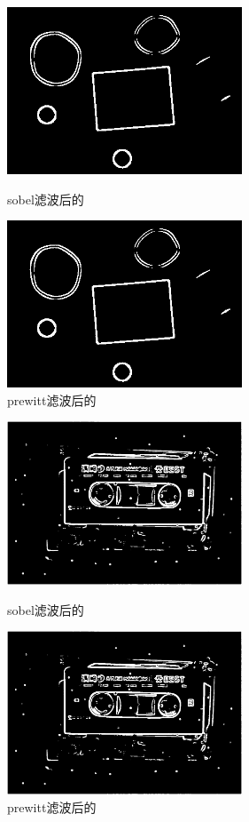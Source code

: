 \documentclass[11pt, a4paper, UTF8]{ctexart}
\begin{document}
    \begin{figure}[H]
      \centering
      \begin{minipage}[t]{0.48\textwidth}
      \centering
      \includegraphics[width=7cm]{sobel_all_rubberband_cap.png}
      \caption{sobel滤波后的}
      \end{minipage}
      \begin{minipage}[t]{0.48\textwidth}
      \centering
      \includegraphics[width=7cm]{prewitt_all_rubberband_cap.png}
      \caption{prewitt滤波后的}
      \end{minipage}
    \end{figure}

    \begin{figure}[H]
      \centering
      \begin{minipage}[t]{0.48\textwidth}
      \centering
      \includegraphics[width=7cm]{sobel_all_noise.png}
      \caption{sobel滤波后的}
      \end{minipage}
      \begin{minipage}[t]{0.48\textwidth}
      \centering
      \includegraphics[width=7cm]{prewitt_all_noise.png}
      \caption{prewitt滤波后的}
      \end{minipage}
    \end{figure}
\end{document}
